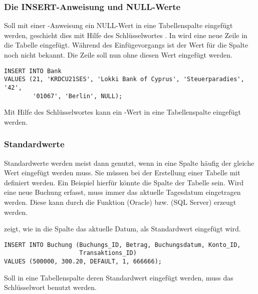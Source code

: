         \subsubsection{Die INSERT-Anweisung und NULL-Werte}
          Soll mit einer \INSERT-Anweisung ein NULL-Wert in eine Tabellenspalte
          eingefügt werden, geschieht dies mit Hilfe des Schlüsselwortes
          . In  wird eine neue Zeile in
          die Tabelle  eingefügt. Während des
          Einfügevorgangs ist der Wert für die Spalte 
          noch nicht bekannt. Die Zeile soll nun ohne diesen Wert eingefügt
          werden.
        \begin{lstlisting}[language=oracle_sql,caption={Ein einfaches \INSERT{} mit \languageorasql{NULL}-Werten},label=sql07_05]
INSERT INTO Bank
VALUES (21, 'KRDCU21SES', 'Lokki Bank of Cyprus', 'Steuerparadies', '42',
        '01067', 'Berlin', NULL);
        \end{lstlisting}
        \begin{merke}
          Mit Hilfe des Schlüsselwortes  kann ein
          -Wert in eine Tabellenspalte eingefügt werden.
        \end{merke}
        \subsubsection{Standardwerte}
          \label{defaultvalues}
          Standardwerte werden meist dann genutzt, wenn in eine Spalte häufig
          der gleiche Wert eingefügt werden muss. Sie müssen bei der
          Erstellung einer Tabelle mit definiert werden. Ein Beispiel hierfür
          könnte die Spalte  der Tabelle
           sein. Wird eine neue Buchung erfasst, muss immer
          das aktuelle Tagesdatum eingetragen werden. Diese kann durch die
          Funktion  (Oracle) bzw.
           (SQL Server) erzeugt werden.

           zeigt, wie in die Spalte
           das aktuelle Datum, als Standardwert
          eingefügt wird.
          \begin{lstlisting}[language=oracle_sql,caption={Einfügen eines Standardwertes},label=sql07_06]
INSERT INTO Buchung (Buchungs_ID, Betrag, Buchungsdatum, Konto_ID,
                     Transaktions_ID)
VALUES (500000, 300.20, DEFAULT, 1, 666666);
          \end{lstlisting}
          \begin{merke}
            Soll in eine Tabellenspalte deren Standardwert eingefügt werden,
            muss das Schlüsselwort  benutzt werden.
          \end{merke}

